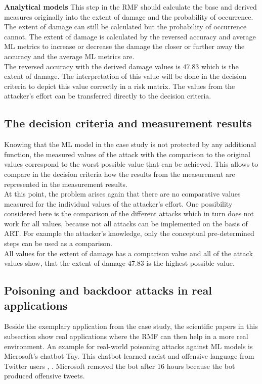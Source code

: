 \noindent\textbf{Analytical models} This step in the RMF should calculate the base and derived measures originally into the extent of damage and the probability of occurrence. The extent of damage can still be calculated but the probability of occurrence cannot. The extent of damage is calculated by the reversed accuracy and average ML metrics to increase or decrease the damage the closer or further away the accuracy and the average ML metrics are. \\
The reversed accuracy with the derived damage values is $47.83$ which is the extent of damage. The interpretation of this value will be done in the decision criteria to depict this value correctly in a risk matrix. The values from the attacker's effort can be transferred directly to the decision criteria.

\subsection{The decision criteria and measurement results}

Knowing that the ML model in the case study is not protected by any additional function, the measured values of the attack with the comparison to the original values correspond to the worst possible value that can be achieved. This allows to compare in the decision criteria how the results from the measurement are represented in the measurement results. \\
At this point, the problem arises again that there are no comparative values measured for the individual values of the attacker's effort. One possibility considered here is the comparison of the different attacks which in turn does not work for all values, because not all attacks can be implemented on the basis of ART. For example the attacker's knowledge, only the conceptual pre-determined steps can be used as a comparison. \\
All values for the extent of damage has a comparison value and all of the attack values show, that the extent of damage $47.83$ is the highest possible value.

\subsection{Poisoning and backdoor attacks in real applications}

Beside the exemplary application from the case study, the scientific papers in this subsection show real applications where the RMF can then help in a more real environment. An example for real-world poisoning attacks against ML models is Microsoft's chatbot Tay. This chatbot learned racist and offensive language from Twitter users \cite{DBLP:conf/iciot/BaracaldoCLSZ18}, \cite{DBLP:conf/ccs/BaracaldoCLS17}. Microsoft removed the bot after 16 hours because the bot produced offensive tweets.
